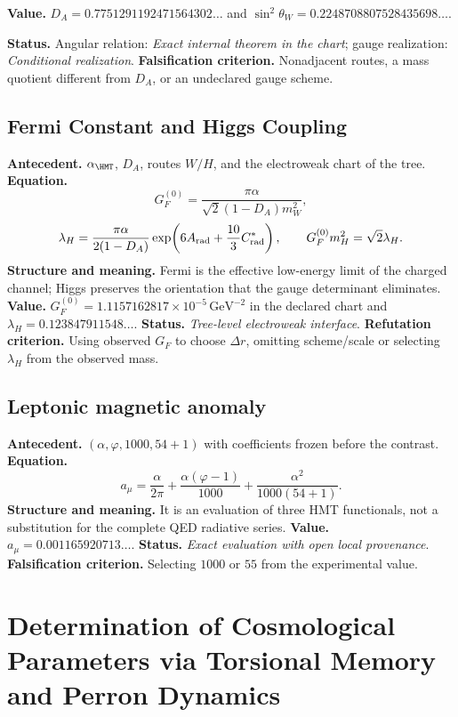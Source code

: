 \textbf{Value.} \(D_A=0.7751291192471564302\ldots\) and
\(\sin^2\theta_W=0.2248708807528435698\ldots\).

\textbf{Status.} Angular relation: \emph{Exact internal theorem in the chart}; gauge realization: \emph{Conditional realization}. \textbf{Falsification criterion.} Nonadjacent routes, a mass quotient different from \(D_A\), or an undeclared gauge scheme.

\subsection*{Fermi Constant and Higgs Coupling }
\textbf{Antecedent.} \(\alpha_{\HMT}\), \(D_A\), routes \(W/H\), and the
electroweak chart of the tree. \textbf{Equation.}
\[
G_F^{(0)}=\frac{\pi\alpha}{\sqrt2(1-D_A)m_W^2},
\]
\[
\lambda_H=\frac{\pi\alpha}{2(1-D_A)}
\exp\!\left(6A_{\rm rad}+\frac{10}{3}C^*_{\rm rad}\right),
\qquad G_F^{(0)}m_H^2=\sqrt2\lambda_H.
\]
\textbf{Structure and meaning.} Fermi is the effective low-energy
limit of the charged channel; Higgs preserves the orientation that the
gauge determinant eliminates.
\textbf{Value.} \(G_F^{(0)}=1.1157162817\times10^{-5}\,\mathrm{GeV}^{-2}\)
in the declared chart and \(\lambda_H=0.123847911548\ldots\).
\textbf{Status.} \emph{Tree-level electroweak interface}.
\textbf{Refutation criterion.} Using observed \(G_F\) to choose \(\Delta r\), omitting
scheme/scale or selecting \(\lambda_H\) from the observed mass.

\subsection*{Leptonic magnetic anomaly }
\textbf{Antecedent.} \((\alpha,\varphi,1000,54+1)\) with coefficients
frozen before the contrast. \textbf{Equation.}
\begin{equation}
a_\mu=\frac{\alpha}{2\pi}
+\frac{\alpha(\varphi-1)}{1000}
+\frac{\alpha^2}{1000(54+1)}.
\label{eq:atlas-anom-mu}
\end{equation}
\textbf{Structure and meaning.} It is an evaluation of three HMT functionals, not a substitution for the complete QED radiative series. \textbf{Value.} \(a_\mu=0.001165920713\ldots\). \textbf{Status.} \emph{Exact evaluation with open local provenance}. \textbf{Falsification criterion.} Selecting \(1000\) or \(55\) from the experimental value.

\section{Determination of Cosmological Parameters via Torsional Memory and Perron Dynamics}

